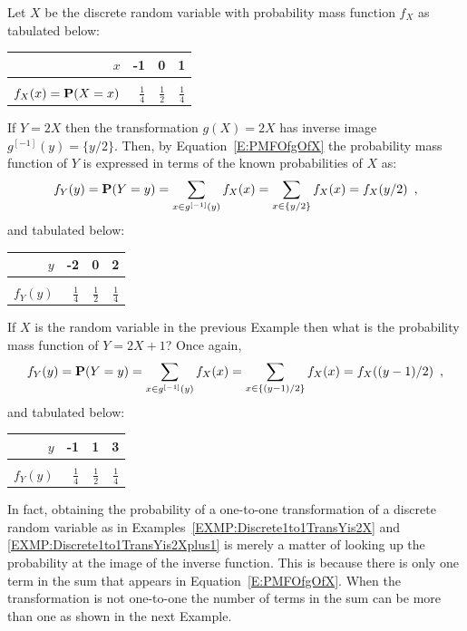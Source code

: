 \begin{example}\label{EXMP:Discrete1to1TransYis2X}
Let $X$ be the discrete random variable with probability mass function $f_X$ as tabulated below:\\
\begin{center}
\begin{tabular}{r|rrr}
$x$ & -1 & 0 & 1\\ \hline
 &  &  & \\ 
$f_X(x)=\mathbf{P}(X=x)$ & $\frac{1}{4}$ & $\frac{1}{2}$ & $\frac{1}{4}$
\end{tabular}
\end{center}
If $Y=2X$ then the transformation $g(X)=2X$ has inverse image $g^{[-1]}(y)=\{y/2\}$.  
Then, by Equation~\eqref{E:PMFOfgOfX} the probability mass function of $Y$ is expressed in terms of the known probabilities of $X$ as:\\ 
$$f_Y(y)=\mathbf{P}(Y=y)= \sum_{x \in g^{[-1]}(y)} f_X(x)  = \sum_{x \in \{y/2\}} f_X(x) = f_X(y/2) \enspace ,$$
and tabulated below:\\
\begin{center}
\begin{tabular}{r|rrr}
$y$ & -2 & 0 & 2\\ \hline
 &  &  & \\ 
$f_Y(y)$ & $\frac{1}{4}$ & $\frac{1}{2}$ & $\frac{1}{4}$
\end{tabular}
\end{center}
\end{example}

\begin{example}\label{EXMP:Discrete1to1TransYis2Xplus1}
If $X$ is the random variable in the previous Example then what is the probability mass function of $Y=2X+1$?
Once again,
$$f_Y(y)=\mathbf{P}(Y=y)= \sum_{x \in g^{[-1]}(y)} f_X(x)  = \sum_{x \in \{(y-1)/2\}} f_X(x) = f_X((y-1)/2) \enspace ,$$
and tabulated below:\\
\begin{center}
\begin{tabular}{r|rrr}
$y$ & -1 & 1 & 3\\ \hline
 &  &  & \\ 
$f_Y(y)$ & $\frac{1}{4}$ & $\frac{1}{2}$ & $\frac{1}{4}$
\end{tabular}
\end{center}
\end{example}

In fact, obtaining the probability of a one-to-one transformation of a discrete random variable as in Examples~\ref{EXMP:Discrete1to1TransYis2X} and \ref{EXMP:Discrete1to1TransYis2Xplus1} is merely a matter of looking up the probability at the image of the inverse function.  This is because there is only one term in the sum that appears in Equation~\eqref{E:PMFOfgOfX}.  When the transformation is not one-to-one the number of terms in the sum can be more than one as shown in the next Example.

